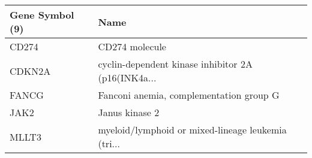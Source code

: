 \begin{tabular}{ll}
\toprule
Gene Symbol (9) &                                               Name \\
\midrule
          CD274 &                                     CD274 molecule \\
         CDKN2A & cyclin-dependent kinase inhibitor 2A (p16(INK4a... \\
          FANCG &            Fanconi anemia, complementation group G \\
           JAK2 &                                     Janus kinase 2 \\
          MLLT3 & myeloid/lymphoid or mixed-lineage leukemia (tri... \\
\bottomrule
\end{tabular}
